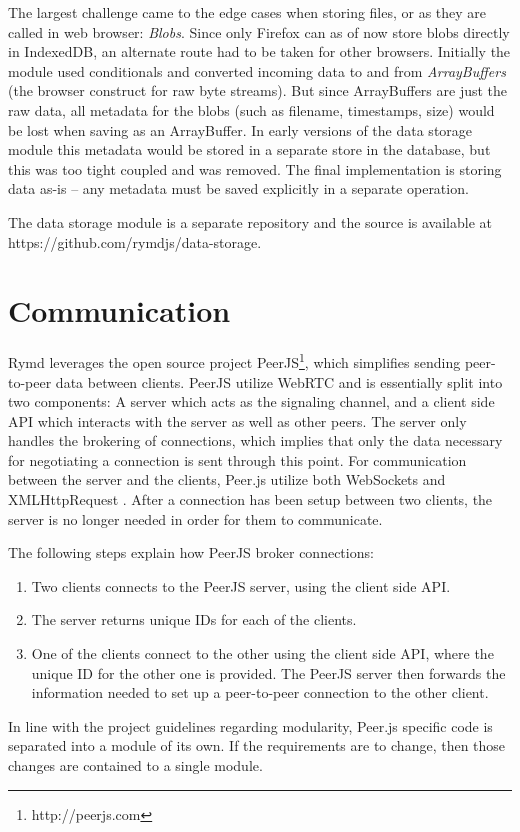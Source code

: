 The largest challenge came to the edge cases when storing files, or as they are called in web browser: \emph{Blobs}. Since only Firefox can as of now store blobs directly in IndexedDB, an alternate route had to be taken for other browsers. Initially the module used conditionals and converted incoming data to and from \emph{ArrayBuffers} (the browser construct for raw byte streams). But since ArrayBuffers are just the raw data, all metadata for the blobs (such as filename, timestamps, size) would be lost when saving as an ArrayBuffer. In early versions of the data storage module this metadata would be stored in a separate store in the database, but this was too tight coupled and was removed. The final implementation is storing data as-is – any metadata must be saved explicitly in a separate operation.

The data storage module is a separate repository and the source is available at https://github.com/rymdjs/data-storage.

\section{Communication}
\label{sec:p2p}

Rymd leverages the open source project PeerJS\footnote{http://peerjs.com}, which simplifies sending peer-to-peer data between clients. PeerJS utilize WebRTC and is essentially split into two components: A server which acts as the signaling channel, and a client side API which interacts with the server as well as other peers. The server only handles the brokering of connections, which implies that only the data necessary for negotiating a connection is sent through this point. For communication between the server and the clients, Peer.js utilize both WebSockets and XMLHttpRequest \cite{PeerjsGithub:2014:Online}. After a connection has been setup between two clients, the server is no longer needed in order for them to communicate.

The following steps explain how PeerJS broker connections:
\begin{enumerate}
\item Two clients connects to the PeerJS server, using the client side API.
\item The server returns unique IDs for each of the clients.
\item One of the clients connect to the other using the client side API, where the unique ID for the other one is provided. The PeerJS server then forwards the information needed to set up a peer-to-peer connection to the other client.
\end{enumerate}
In line with the project guidelines regarding modularity, Peer.js specific code is separated into a module of its own. If the requirements are to change, then those changes are contained to a single module.



